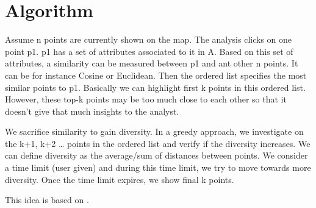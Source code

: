 \section{Algorithm}\label{sec:algorithm}

Assume n points are currently shown on the map. The analysis clicks on one point p1. p1 has a set of attributes associated to it in A. Based on this set of attributes, a similarity can be measured between p1 and ant other n points. It can be for instance Cosine or Euclidean. Then the ordered list specifies the most similar points to p1. Basically we can highlight first k points in this ordered list. However, these top-k points may be too much close to each other so that it doesn’t give that much insights to the analyst.

We sacrifice similarity to gain diversity. In a greedy approach, we investigate on the k+1, k+2 … points in the ordered list and verify if the diversity increases. We can define diversity as the average/sum of distances between points. We consider a time limit (user given) and during this time limit, we try to move towards more diversity. Once the time limit expires, we show final k points.

This idea is based on \cite{Omidvar-Tehrani:2015}.
